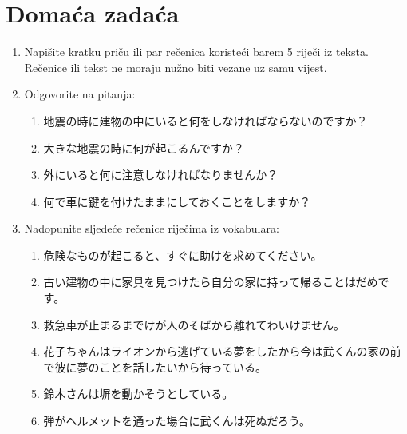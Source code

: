 \documentclass[a5paper, 10pt]{tekst}
\begin{document}
	\section*{Domaća zadaća}
	\begin{enumerate}
		\item Napišite kratku priču ili par rečenica koristeći barem 5 riječi iz teksta. Rečenice ili tekst ne moraju nužno biti vezane uz samu vijest. 
		\item Odgovorite na pitanja:
		\begin{enumerate}[label=(\roman*)]
			\item 地震の時に建物の中にいると何をしなければならないのですか？
			\item 大きな地震の時に何が起こるんですか？
			\item 外にいると何に注意しなければなりませんか？
			\item 何で車に鍵を付けたままにしておくことをしますか？
		\end{enumerate}
		
		\item Nadopunite sljedeće rečenice riječima iz vokabulara:
		\begin{enumerate}[label=(\roman*)]
			\item 危険なものが起こると、すぐに助けを求めてください。
			\item 古い建物の中に家具を見つけたら自分の家に持って帰ることはだめです。
			\item 救急車が止まるまでけが人のそばから離れてわいけません。
			\item 花子ちゃんはライオンから逃げている夢をしたから今は武くんの家の前で彼に夢のことを話したいから待っている。
			\item 鈴木さんは塀を動かそうとしている。
			\item 弾がヘルメットを通った場合に武くんは死ぬだろう。
		\end{enumerate}
	\end{enumerate}
\end{document}
